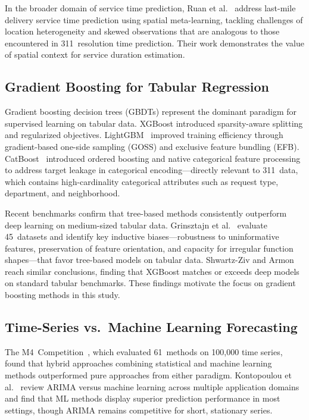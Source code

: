 \documentclass[sigconf,nonacm]{acmart}
\begin{document}
In the broader domain of service time prediction, Ruan et
al.~\cite{ruan2022servicetime} address last-mile delivery service
time prediction using spatial meta-learning, tackling challenges
of location heterogeneity and skewed observations that are
analogous to those encountered in 311~resolution time prediction.
Their work demonstrates the value of spatial context for service
duration estimation.

\subsection{Gradient Boosting for Tabular Regression}

Gradient boosting decision trees (GBDTs) represent the dominant
paradigm for supervised learning on tabular data. XGBoost
\cite{chen2016xgboost} introduced sparsity-aware splitting and
regularized objectives. LightGBM~\cite{ke2017lightgbm} improved
training efficiency through gradient-based one-side sampling
(GOSS) and exclusive feature bundling (EFB).
CatBoost~\cite{prokhorenkova2018catboost} introduced ordered
boosting and native categorical feature processing to address
target leakage in categorical encoding---directly relevant to
311~data, which contains high-cardinality categorical attributes
such as request type, department, and neighborhood.

Recent benchmarks confirm that tree-based methods consistently
outperform deep learning on medium-sized tabular data.
Grinsztajn et al.~\cite{grinsztajn2022trees} evaluate
45~datasets and identify key inductive biases---robustness to
uninformative features, preservation of feature orientation, and
capacity for irregular function shapes---that favor tree-based
models on tabular data. Shwartz-Ziv and
Armon~\cite{shwartzziv2022tabular} reach similar conclusions,
finding that XGBoost matches or exceeds deep models on standard
tabular benchmarks. These findings motivate the focus on gradient
boosting methods in this study.

\subsection{Time-Series vs.\ Machine Learning Forecasting}

The M4~Competition~\cite{makridakis2020m4}, which evaluated
61~methods on 100{,}000 time series, found that hybrid approaches
combining statistical and machine learning methods outperformed
pure approaches from either paradigm. Kontopoulou et
al.~\cite{kontopoulou2023arima} review ARIMA versus machine
learning across multiple application domains and find that ML
methods display superior prediction performance in most settings,
though ARIMA remains competitive for short, stationary series.
\end{document}
